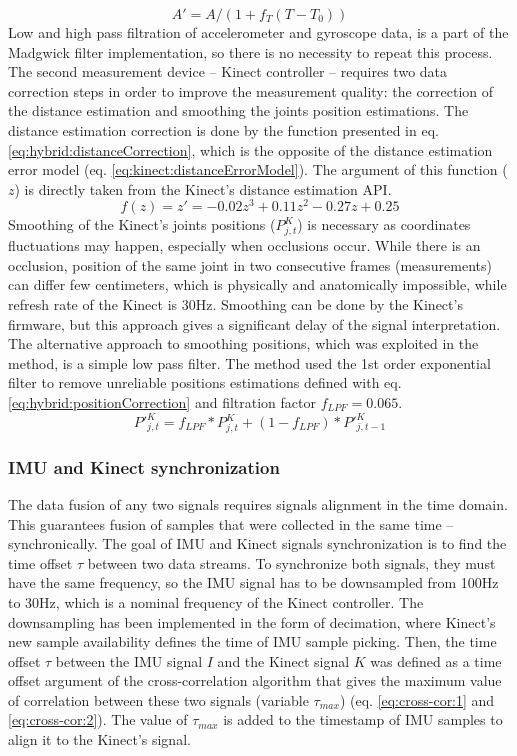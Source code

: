 \documentclass[sensors,article,submit,moreauthors,pdftex,10pt,a4paper]{mdpi}
\begin{document}
	\begin{equation}
		A'=A/(1+ f_T (T-T_0))
		\label{eq:hybrid:tempCorrection}
	\end{equation}
	Low and high pass filtration of accelerometer and gyroscope data, is a part of the Madgwick filter implementation, so there is no necessity to repeat this process.
	The second measurement device – Kinect controller – requires two data correction steps in order to improve the measurement quality: the correction of the distance estimation and smoothing the joints position estimations. The distance estimation correction is done by the function presented in eq. \ref{eq:hybrid:distanceCorrection}, which is the opposite of the distance estimation error model (eq. \ref{eq:kinect:distanceErrorModel}). The argument of this function ($z$) is directly taken from the Kinect’s distance estimation API.
	\begin{equation}
		f(z)=z'=-0.02z^3+0.11z^2-0.27z+0.25
		\label{eq:hybrid:distanceCorrection}
	\end{equation}
	Smoothing of the Kinect’s joints positions ($P_{j,t}^K$) is necessary as coordinates fluctuations may happen, especially when occlusions occur. While there is an occlusion, position of the same joint in two consecutive frames (measurements) can differ few centimeters, which is physically and anatomically impossible, while refresh rate of the Kinect is 30Hz. Smoothing can be done by the Kinect’s firmware, but this approach gives a significant delay of the signal interpretation. The alternative approach to smoothing positions, which was exploited in the method, is a simple low pass filter. The method used the 1st order exponential filter to remove unreliable positions estimations defined with eq. \ref{eq:hybrid:positionCorrection} and filtration factor $f_{LPF} = 0.065$.
	\begin{equation}
		{P'}_{j,t}^K=f_{LPF} * P_{j,t}^K+(1-f_{LPF}) * {P'}_{j,t-1}^K
		\label{eq:hybrid:positionCorrection}
	\end{equation}
		
	\subsubsection{IMU and Kinect synchronization}
	The data fusion of any two signals requires signals alignment in the time domain. This guarantees fusion of samples that were collected in the same time -- synchronically. The goal of IMU and Kinect signals synchronization is to find the time offset $\tau$ between two data streams. To synchronize both signals, they must have the same frequency, so the IMU signal has to be downsampled from 100Hz to 30Hz, which is a nominal frequency of the Kinect controller. The downsampling has been implemented in the form of decimation, where Kinect’s new sample availability defines the time of IMU sample picking. Then, the time offset $\tau$ between the IMU signal $I$ and the Kinect signal $K$ was defined as a time offset argument of the cross-correlation algorithm that gives the maximum value of correlation between these two signals (variable $\tau_{max}$) (eq. \ref{eq:cross-cor:1} and \ref{eq:cross-cor:2}). The value of $\tau_{max}$ is added to the timestamp of IMU samples to align it to the Kinect’s signal.
		
\end{document}
